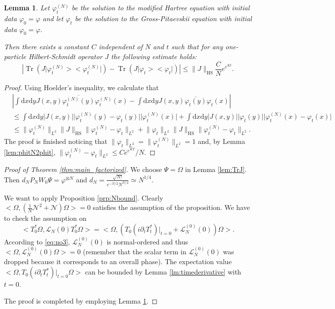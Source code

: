 \documentclass[11pt,a4paper,draft,DIV11]{scrartcl}	%
\newtheorem{lem}[thm]{Lemma}
\newcommand{\di}{\textrm{d}}		%
\newcommand{\Lcal}{\mathcal{L}}		%
\newcommand{\Ncal}{\mathcal{N}}		%
\newcommand{\scal}[2]{\big<#1,#2\big>} %
\newcommand{\cc}[1]{\overline{#1}}	%
\newcommand{\norm}[1]{\lVert#1\rVert}	%
\newcommand{\ph}{\varphi_t^{(N)}}	%
\newcommand{\project}[1]{\lvert #1 \big>\big< #1\rvert}	%
\newcommand{\Tr}{\operatorname{Tr}}	%
\newcommand{\bd}{\begin{displaymath}}			%
\newcommand{\ed}{\end{displaymath}}
\begin{document}
\begin{lem}
\label{lem:phNtoph}
Let $\ph$ be the solution to the modified Hartree equation with initial data $\varphi_0 = \varphi$ and let $\varphi_t$ be the solution to the Gross-Pitaevskii equation with initial data $\varphi_0 = \varphi$.

Then there exists a constant $C$ independent of $N$ and $t$ such that for any one-particle Hilbert-Schmidt operator $J$ the following estimate holds:
\bd
\left\lvert \Tr\left(J \project{\ph}\right) - \Tr\left(J \project{\varphi_t}\right) \right\rvert \leq \norm{J}_{\textrm{HS}} \frac{C}{N} e^{e^{Kt}}.
\ed
\end{lem}
\begin{proof}
Using Hoelder's inequality, we calculate that
\begin{align*}
& \left\lvert \int \di x \di y J(x,y) \cc{\ph(y)} \ph(x) - \int \di x\di y J(x,y) \cc{\varphi_t(y)} \varphi_t(x) \right\rvert \\ 
& \leq \int \di x \di y \lvert J(x,y)\rvert \lvert \ph(y) - \varphi_t(y)\rvert \lvert \ph(x)\rvert + \int \di x \di y \lvert J(x,y) \rvert \lvert \varphi_t(y)\rvert \lvert \ph(x)-\varphi_t(x)\rvert \\
& \leq \norm{\ph}_{L^2} \norm{J}_{\textrm{HS}} \norm{\ph - \varphi_t}_{L^2} + \norm{\varphi_t}_{L^2} \norm{J}_{\textrm{HS}} \norm{\ph - \varphi_t}_{L^2}. 
\end{align*}
The proof is finished noticing that $\norm{\varphi_t}_{L^2} = \norm{\ph}_{L^2} = 1$ and, by Lemma \ref{lem:phitN2phit}, $\norm{\ph - \varphi_t}_{L^2} \leq C e^{e^{KT}}/N$.
\end{proof}

\begin{proof}[Proof of Theorem \ref{thm:main_factorized}]
We choose $\Psi = \Omega$ in Lemma \ref{lem:TrJ}. Then $d_N P_N W_0 \Psi = \varphi^{\otimes N}$ and $d_N = \frac{\sqrt{N!}}{e^{-N/2}N^{N/2}} \simeq N^{1/4}$.

We want to apply Proposition \ref{prp:Nbound}. Clearly $\scal{\Omega}{\left(\frac{1}{N}\Ncal^2 + \Ncal\right)\Omega} = 0$ satisfies the assumption of the proposition. We have to check the assumption on 
\bd
\scal{T^\ast_0 \Omega}{\Lcal_N(0)T^\ast_0 \Omega} = \scal{\Omega}{\left(T_0(i\partial_t T^\ast_t)\rvert_{t=0} + \Lcal_N^{(0)}(0)\right)\Omega}.
\ed
According to \eqref{eq:no3}, $\Lcal_N^{(0)}(0)$ is normal-ordered and thus $\scal{\Omega}{\Lcal_N^{(0)}(0)\Omega} = 0$ (remember that the scalar term in $\Lcal_N^{(0)}(0)$ was dropped because it corresponds to an overall phase). The expectation value $\scal{\Omega}{T_0(i\partial_t T^\ast_t)\rvert_{t=0} \Omega}$ can be bounded by Lemma \ref{lm:timederivative} with $t=0$.

The proof is completed by employing Lemma \ref{lem:phNtoph}.
\end{proof}
\end{document}
